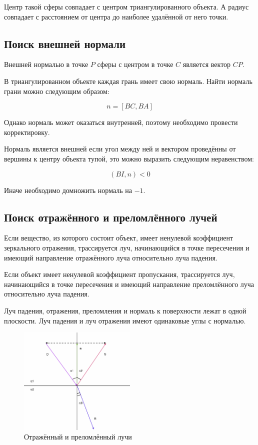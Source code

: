 Центр такой сферы совпадает с центром триангулированного объекта. А радиус совпадает с расстоянием от центра до наиболее удалённой от него точки.

\subsection{Поиск внешней нормали}

Внешней нормалью в точке $P$ сферы с центром в точке $C$ является вектор $CP$.

В триангулированном объекте каждая грань имеет свою нормаль. Найти нормаль грани можно следующим образом:

\begin{equation}
n = [BC, BA]
\end{equation}

Однако нормаль может оказаться внутренней, поэтому необходимо провести корректировку.

Нормаль является внешней если угол между ней и вектором проведённы от вершины к центру объекта тупой, это можно выразить следующим неравенством:

\begin{equation}
(BI, n) < 0
\end{equation}

Иначе необходимо домножить нормаль на $-1$.

\subsection{Поиск отражённого и преломлённого лучей}

Если вещество, из которого состоит объект, имеет ненулевой коэффициент зеркального отражения, трассируется луч, начинающийся в точке пересечения и имеющий направление отражённого луча относительно луча падения.

Если объект имеет ненулевой коэффициент пропускания, трассируется луч, начинающийся в точке пересечения и имеющий направление преломлённого луча относительно луча падения.

Луч падения, отражения, преломления и нормаль к поверхности лежат в одной плоскости. Луч падения и луч отражения имеют одинаковые углы с нормалью.

\begin{figure}[h]
	\centering
	\includegraphics[width=0.5\textwidth]{img/specular_refract.png}
	\caption{Отражённый и преломлённый лучи}
	\label{fig:specular_refract}
\end{figure}

